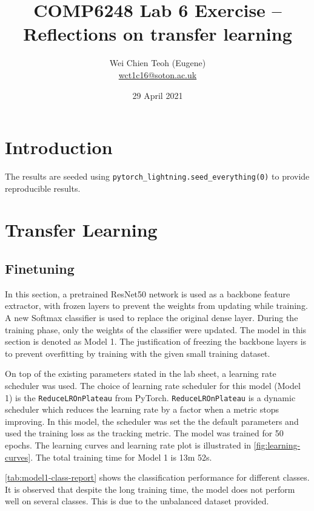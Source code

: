 \documentclass[twocolumn]{article}
\title{\Large COMP6248 Lab 6 Exercise -- Reflections on transfer learning}
\author{\small Wei Chien Teoh (Eugene)\\\bigskip \href{mailto:wct1c16@soton.ac.uk}{wct1c16@soton.ac.uk}}
\date{\small 29 April 2021}
\begin{document}
\maketitle

\section*{Introduction}

The results are seeded using \lstinline{pytorch_lightning.seed_everything(0)} to provide reproducible results.

\section{Transfer Learning}

\subsection{Finetuning}

In this section, a pretrained ResNet50 network is used as a backbone feature extractor, with frozen layers to prevent the weights from updating while training. A new Softmax classifier is used to replace the original dense layer. During the training phase, only the weights of the classifier were updated. The model in this section is denoted as Model 1. The justification of freezing the backbone layers is to prevent overfitting by training with the given small training dataset.

On top of the existing parameters stated in the lab sheet, a learning rate scheduler was used. The choice of learning rate scheduler for this model (Model 1) is the \lstinline{ReduceLROnPlateau} from PyTorch. \lstinline{ReduceLROnPlateau} is a dynamic scheduler which reduces the learning rate by a factor when a metric stops improving. In this model, the scheduler was set the the default parameters and used the training loss as the tracking metric. The model was trained for 50 epochs. The learning curves and learning rate plot is illustrated in \cref{fig:learning-curves}. The total training time for Model 1 is 13m 52s.

\cref{tab:model1-class-report} shows the classification performance for different classes. It is observed that despite the long training time, the model does not perform well on several classes. This is due to the unbalanced dataset provided.
\end{document}
